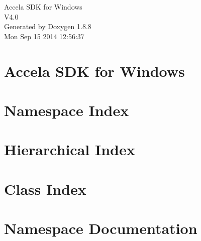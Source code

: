 \documentclass[twoside]{book}
\newcommand{\+}{\discretionary{\mbox{\scriptsize$\hookleftarrow$}}{}{}}
\newcommand{\clearemptydoublepage}{%
  \newpage{\pagestyle{empty}\cleardoublepage}%
}
\begin{document}
\hypersetup{pageanchor=false,
             bookmarks=true,
             bookmarksnumbered=true,
             pdfencoding=unicode
            }
\begin{titlepage}
\vspace*{7cm}
\begin{center}%
{\Large Accela S\+D\+K for Windows \\[1ex]\large V4.\+0 }\\
\vspace*{1cm}
{\large Generated by Doxygen 1.8.8}\\
\vspace*{0.5cm}
{\small Mon Sep 15 2014 12:56:37}\\
\end{center}
\end{titlepage}
\clearemptydoublepage
\tableofcontents
\clearemptydoublepage
{}
\hypersetup{pageanchor=true}

\chapter{Accela S\+D\+K for Windows}
\label{index}\hypertarget{index}{}
\chapter{Namespace Index}

\chapter{Hierarchical Index}

\chapter{Class Index}

\chapter{Namespace Documentation}





\end{document}

